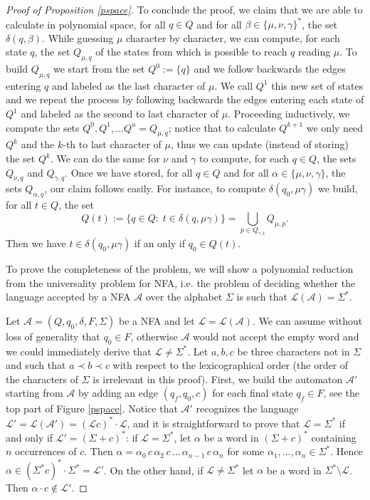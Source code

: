 \documentclass[runningheads]{llncs}
\newcommand{\la}[1]{\mathcal L(\mathcal #1)}
\begin{document}
\begin{proof}[\noindent Proof of Proposition \ref{pspace}]
 To conclude the proof, we claim that we are able to calculate in polynomial space, for all $q \in Q$ and for all $\beta \in \{\mu,\nu,\gamma\}^*$, the set $\delta(q,\beta)$. While guessing $\mu$ character by character, we can compute, for each state $q$, the set $Q_{\mu,q}$ of the states from which is possible to reach $q$ reading $\mu$. To build $Q_{\mu,q}$ we start from the set $Q^0 := \{q\}$ and we follow backwards the edges entering $q$ and labeled as the last character of $\mu$. We call $Q^1$ this new set of states and we repeat the process by following backwards the edges entering each state of $Q^1$ and labeled as the second to last character of $\mu$. Proceeding inductively, we compute the sets $Q^0, Q^1, \dots Q^u = Q_{\mu,q}$; notice that to calculate $Q^{k+1}$ we only need $Q^k$ and the $k$-th to last character of $\mu$, thus we can update (instead of storing) the set $Q^k$. We can do the same for $\nu$ and $\gamma$ to compute, for each $q \in Q$, the sets $Q_{\nu,q}$ and $Q_{\gamma,q}$. Once we have stored, for all $q \in Q$ and for all $\alpha \in \{\mu, \nu, \gamma\}$, the sets $Q_{\alpha,q}$, our claim follows easily. For instance, to compute $\delta(q_0, \mu\gamma)$ we build, for all $t \in Q$, the set 
 \[
 Q(t) := \{q \in Q:\; t \in \delta(q, \mu\gamma) \} = \bigcup_{p\in Q_{\gamma,t}} Q_{\mu,p}.
 \] 
 Then we have $t \in \delta(q_0, \mu\gamma)$ if an only if $q_0 \in Q(t)$.

\vskip 5mm

To prove the completeness of the problem, we will show a polynomial reduction from the universality problem for NFA, i.e. the problem of deciding whether the language accepted by a NFA $\mathcal A$ over the alphabet $\Sigma$ is such that $\la A = \Sigma^*$. 

Let $\mathcal A = (Q, q_0,\delta, F, \Sigma)$ be a NFA and let $\mathcal L = \la A$. We can assume without loss of generality that $q_0 \in F$, otherwise $\mathcal A$ would not accept the empty word and we could immediately derive that $\mathcal L \ne \Sigma^*$. Let $a,b,c$ be three characters not in $\Sigma$ and such that $a\prec b\prec c$ with respect to the lexicographical order (the order of the characters of $\Sigma$ is irrelevant in this proof). First, we build the automaton $\mathcal A'$ starting from $\mathcal A$ by adding an edge $(q_f, q_0, c)$ for each final state $q_f \in F$, see the top part of Figure \ref{pspace}. Notice that $\mathcal A'$ recognizes the language $\mathcal L' = \la{A'} = (\mathcal Lc)^* \cdot \mathcal L$, and it is straightforward to prove that $\mathcal L = \Sigma^*$ if and only if $\mathcal L' = (\Sigma + c)^*$: if $\mathcal L = \Sigma^*$, let $\alpha$ be a word in $(\Sigma + c)^*$ containing $n$ occurrences of $c$. Then $\alpha = \alpha_0\, c\, \alpha_2\, c\,\dots\, \alpha_{n-1}\, c\, \alpha_{n}$ for some $\alpha_1, \dots, \alpha_{n} \in \Sigma^*$. Hence $\alpha \in (\Sigma^*c)^*\cdot \Sigma^* = \mathcal L'$. On the other hand, if $\mathcal L \ne \Sigma^*$ let $\alpha$ be a word in $\Sigma^* \setminus \mathcal L$. Then $\alpha \cdot c \notin \mathcal L'$.


\end{proof}
\end{document}

